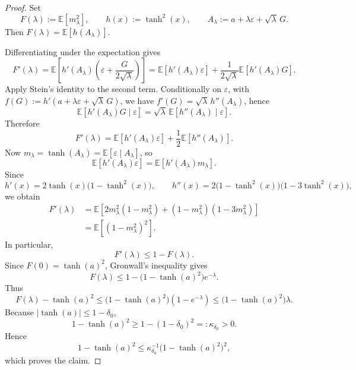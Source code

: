 \documentclass[10pt]{article}
\newcommand{\Ebb}{\mathbb E}
\begin{document}
\begin{proof}
Set
\[
    F(\lambda):=\Ebb[m_\lambda^2],
    \qquad
    h(x):=\tanh^2(x),
    \qquad
    A_\lambda:=a+\lambda\varepsilon+\sqrt{\lambda}\,G.
\]
Then $F(\lambda)=\Ebb[h(A_\lambda)]$.

Differentiating under the expectation gives
\[
    F'(\lambda)
    =
    \Ebb\!\left[
        h'(A_\lambda)\!\left(
            \varepsilon+\frac{G}{2\sqrt{\lambda}}
        \right)
    \right]
    =
    \Ebb[h'(A_\lambda)\varepsilon]
    +
    \frac{1}{2\sqrt{\lambda}}\Ebb[h'(A_\lambda)G].
\]
Apply Stein's identity to the second term. Conditionally on $\varepsilon$,
with $f(G):=h'(a+\lambda\varepsilon+\sqrt{\lambda}\,G)$, we have
$f'(G)=\sqrt{\lambda}\,h''(A_\lambda)$, hence
\[
    \Ebb[h'(A_\lambda)G\mid\varepsilon]
    =
    \sqrt{\lambda}\,\Ebb[h''(A_\lambda)\mid\varepsilon].
\]
Therefore
\[
    F'(\lambda)
    =
    \Ebb[h'(A_\lambda)\varepsilon]
    +
    \frac12 \Ebb[h''(A_\lambda)].
\]
Now $m_\lambda=\tanh(A_\lambda)=\Ebb[\varepsilon\mid A_\lambda]$, so
\[
    \Ebb[h'(A_\lambda)\varepsilon]
    =
    \Ebb[h'(A_\lambda)m_\lambda].
\]
Since
\[
    h'(x)=2\tanh(x)\bigl(1-\tanh^2(x)\bigr),
    \qquad
    h''(x)=2\bigl(1-\tanh^2(x)\bigr)\bigl(1-3\tanh^2(x)\bigr),
\]
we obtain
\begin{align*}
    F'(\lambda)
    &=
    \Ebb\!\left[
        2m_\lambda^2(1-m_\lambda^2)
        +
        (1-m_\lambda^2)(1-3m_\lambda^2)
    \right]\\
    &=
    \Ebb\!\left[(1-m_\lambda^2)^2\right].
\end{align*}
In particular,
\[
    F'(\lambda)\le 1-F(\lambda).
\]
Since $F(0)=\tanh(a)^2$, Gronwall's inequality gives
\[
    F(\lambda)
    \le
    1-\bigl(1-\tanh(a)^2\bigr)e^{-\lambda}.
\]
Thus
\[
    F(\lambda)-\tanh(a)^2
    \le
    \bigl(1-\tanh(a)^2\bigr)(1-e^{-\lambda})
    \le
    \bigl(1-\tanh(a)^2\bigr)\lambda.
\]
Because $|\tanh(a)|\le 1-\delta_0$,
\[
    1-\tanh(a)^2
    \ge
    1-(1-\delta_0)^2
    =:
    \kappa_{\delta_0}>0.
\]
Hence
\[
    1-\tanh(a)^2
    \le
    \kappa_{\delta_0}^{-1}\bigl(1-\tanh(a)^2\bigr)^2,
\]
which proves the claim.
\end{proof}
\end{document}
